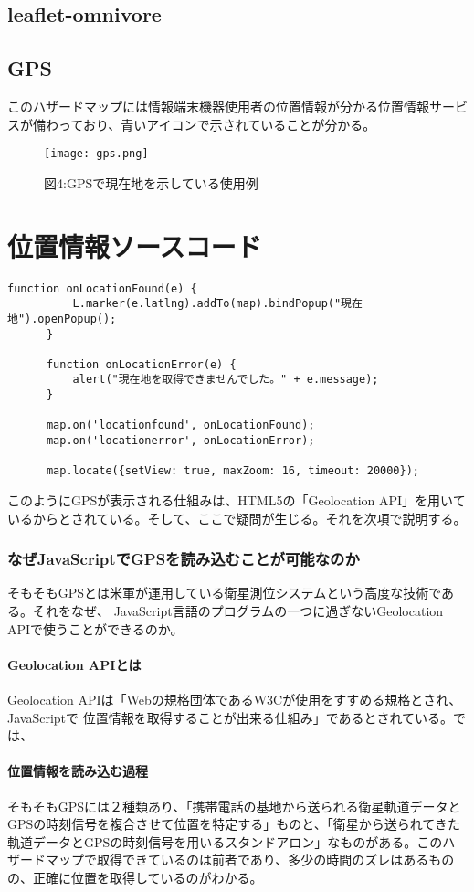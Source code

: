 \documentclass[report]{jsbook}
\begin{document}
\section{leaflet-omnivore}
\section{GPS}
このハザードマップには情報端末機器使用者の位置情報が分かる位置情報サービスが備わっており、青いアイコンで示されていることが分かる。
\begin{center}
   \begin{figure}[htp]
    \texttt{[image: gps.png]}
    \caption{図4:GPSで現在地を示している使用例}
   \end{figure}
\end{center}
\chapter{位置情報ソースコード}
\begin{lstlisting}[caption=ソースコード2,label=位置情報を表す]
  function onLocationFound(e) {
          L.marker(e.latlng).addTo(map).bindPopup("現在地").openPopup();
      }
 
      function onLocationError(e) {
          alert("現在地を取得できませんでした。" + e.message);
      }
 
      map.on('locationfound', onLocationFound);
      map.on('locationerror', onLocationError);
 
      map.locate({setView: true, maxZoom: 16, timeout: 20000});
  \end{lstlisting}
このようにGPSが表示される仕組みは、HTML5の「Geolocation API」を用いているからとされている。そして、ここで疑問が生じる。それを次項で説明する。
\subsection{なぜJavaScriptでGPSを読み込むことが可能なのか}
そもそもGPSとは米軍が運用している衛星測位システムという高度な技術である。それをなぜ、
JavaScript言語のプログラムの一つに過ぎないGeolocation APIで使うことができるのか。
\subsubsection{Geolocation APIとは}
Geolocation APIは「Webの規格団体であるW3Cが使用をすすめる規格とされ、JavaScriptで
  位置情報を取得することが出来る仕組み」であるとされている。では、
\subsubsection{位置情報を読み込む過程}
そもそもGPSには２種類あり、「携帯電話の基地から送られる衛星軌道データとGPSの時刻信号を複合させて位置を特定する」ものと、「衛星から送られてきた軌道データとGPSの時刻信号を用いるスタンドアロン」なものがある。このハザードマップで取得できているのは前者であり、多少の時間のズレはあるものの、正確に位置を取得しているのがわかる。
\end{document}
